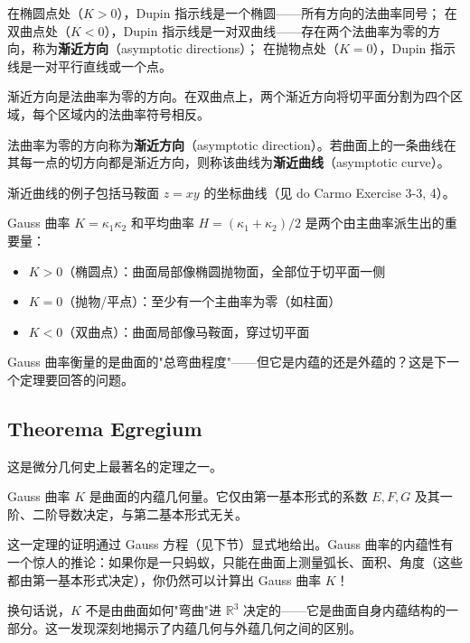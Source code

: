 在椭圆点处（$K>0$），Dupin 指示线是一个椭圆——所有方向的法曲率同号；
在双曲点处（$K<0$），Dupin 指示线是一对双曲线——存在两个法曲率为零的方向，称为\textbf{渐近方向}（asymptotic directions）；
在抛物点处（$K=0$），Dupin 指示线是一对平行直线或一个点。

渐近方向是法曲率为零的方向。在双曲点上，两个渐近方向将切平面分割为四个区域，每个区域内的法曲率符号相反。

\begin{Definition}[渐近方向与渐近曲线]\label{def:asymptotic-directions}
法曲率为零的方向称为\textbf{渐近方向}（asymptotic direction）。若曲面上的一条曲线在其每一点的切方向都是渐近方向，则称该曲线为\textbf{渐近曲线}（asymptotic curve）。
\end{Definition}

渐近曲线的例子包括马鞍面 $z = xy$ 的坐标曲线（见 do Carmo Exercise 3-3, 4）。

Gauss 曲率 $K = \kappa_1 \kappa_2$ 和平均曲率 $H = (\kappa_1 + \kappa_2)/2$ 是两个由主曲率派生出的重要量：

\begin{itemize}
    \item $K > 0$（椭圆点）：曲面局部像椭圆抛物面，全部位于切平面一侧
    \item $K = 0$（抛物/平点）：至少有一个主曲率为零（如柱面）
    \item $K < 0$（双曲点）：曲面局部像马鞍面，穿过切平面
\end{itemize}

Gauss 曲率衡量的是曲面的"总弯曲程度"——但它是内蕴的还是外蕴的？这是下一个定理要回答的问题。

\subsection{Theorema Egregium}\label{sec:theorema-egregium}

这是微分几何史上最著名的定理之一。

\begin{Theorem}\label{th:theorema-egregium}
Gauss 曲率 $K$ 是曲面的内蕴几何量。它仅由第一基本形式的系数 $E, F, G$ 及其一阶、二阶导数决定，与第二基本形式无关。
\end{Theorem}

这一定理的证明通过 Gauss 方程（见下节）显式地给出。Gauss 曲率的内蕴性有一个惊人的推论：如果你是一只蚂蚁，只能在曲面上测量弧长、面积、角度（这些都由第一基本形式决定），你仍然可以计算出 Gauss 曲率 $K$！

换句话说，$K$ 不是由曲面如何"弯曲"进 $\mathbb{R}^3$ 决定的——它是曲面自身内蕴结构的一部分。这一发现深刻地揭示了内蕴几何与外蕴几何之间的区别。

